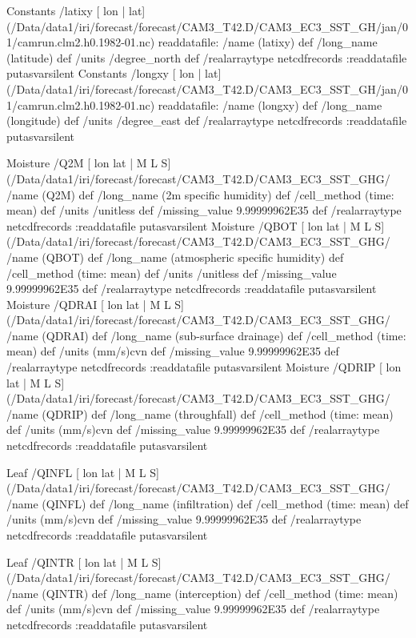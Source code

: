 \begin{ingrid}
Constants /latixy{
[ lon | lat] (/Data/data1/iri/forecast/forecast/CAM3_T42.D/CAM3_EC3_SST_GH/jan/01/camrun.clm2.h0.1982-01.nc) readdatafile:
/name (latixy) def
 /long_name (latitude) def
 /units /degree_north def
 /realarraytype netcdfrecords :readdatafile
}putasvarsilent
Constants /longxy{
[ lon | lat] (/Data/data1/iri/forecast/forecast/CAM3_T42.D/CAM3_EC3_SST_GH/jan/01/camrun.clm2.h0.1982-01.nc) readdatafile:
/name (longxy) def
 /long_name (longitude) def
 /units /degree_east def
 /realarraytype netcdfrecords :readdatafile
}putasvarsilent


Moisture /Q2M{
[ lon lat | M L S] (/Data/data1/iri/forecast/forecast/CAM3_T42.D/CAM3_EC3_SST_GHG/%
/name (Q2M) def
 /long_name (2m specific humidity) def
 /cell_method (time: mean) def
 /units /unitless def
 /missing_value 9.99999962E35 def
 /realarraytype netcdfrecords :readdatafile
}putasvarsilent
Moisture /QBOT{
[ lon lat | M L S] (/Data/data1/iri/forecast/forecast/CAM3_T42.D/CAM3_EC3_SST_GHG/%
/name (QBOT) def
 /long_name (atmospheric specific humidity) def
 /cell_method (time: mean) def
 /units /unitless def
 /missing_value 9.99999962E35 def
 /realarraytype netcdfrecords :readdatafile
}putasvarsilent
Moisture /QDRAI{
[ lon lat | M L S] (/Data/data1/iri/forecast/forecast/CAM3_T42.D/CAM3_EC3_SST_GHG/%
/name (QDRAI) def
 /long_name (sub-surface drainage) def
 /cell_method (time: mean) def
 /units (mm/s)cvn def
 /missing_value 9.99999962E35 def
 /realarraytype netcdfrecords :readdatafile
}putasvarsilent
Moisture /QDRIP{
[ lon lat | M L S] (/Data/data1/iri/forecast/forecast/CAM3_T42.D/CAM3_EC3_SST_GHG/%
/name (QDRIP) def
 /long_name (throughfall) def
 /cell_method (time: mean) def
 /units (mm/s)cvn def
 /missing_value 9.99999962E35 def
 /realarraytype netcdfrecords :readdatafile
}putasvarsilent

Leaf /QINFL{
[ lon lat | M L S] (/Data/data1/iri/forecast/forecast/CAM3_T42.D/CAM3_EC3_SST_GHG/%
/name (QINFL) def
 /long_name (infiltration) def
 /cell_method (time: mean) def
 /units (mm/s)cvn def
 /missing_value 9.99999962E35 def
 /realarraytype netcdfrecords :readdatafile
}putasvarsilent

Leaf /QINTR{
[ lon lat | M L S] (/Data/data1/iri/forecast/forecast/CAM3_T42.D/CAM3_EC3_SST_GHG/%
/name (QINTR) def
 /long_name (interception) def
 /cell_method (time: mean) def
 /units (mm/s)cvn def
 /missing_value 9.99999962E35 def
 /realarraytype netcdfrecords :readdatafile
}putasvarsilent


\end{ingrid}
